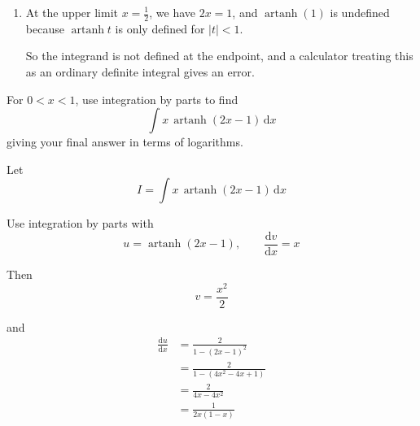 \documentclass[leqno]{article}
\begin{document}
\begin{enumerate}[
  label=\textbf{\arabic*.},
  leftmargin=*,
  topsep=0pt,
  partopsep=0pt,
  parsep=0pt
]
\begin{djsSolution}
\begin{enumerate}[label=\textbf{(\alph*)}]
So
\begin{align*}
I&=\frac13\times\frac12\ln 5+\frac14\ln\left(\frac59\right)\\
&=\frac16\ln 5+\frac14(\ln 5-\ln 9)\\
&=\frac16\ln 5+\frac14\ln 5-\frac12\ln 3\\
&=\frac{5}{12}\ln 5-\frac12\ln 3
\end{align*}

This can also be written as
\begin{align*}
I&=\frac1{12}\bigl(5\ln 5-6\ln 3\bigr)\\
&=\frac1{12}\ln\left(\frac{5^5}{3^6}\right)\\
&=\frac1{12}\ln\left(\frac{3125}{729}\right)
\end{align*}

Therefore
\[
\int_0^{1/3}\operatorname{artanh}(2x)\,\mathrm{d}x
=\frac{5}{12}\ln 5-\frac12\ln 3
=\frac1{12}\ln\left(\frac{3125}{729}\right)
\]

  \item At the upper limit \(x=\frac12\), we have \(2x=1\), and \(\operatorname{artanh}(1)\) is undefined because \(\operatorname{artanh}t\) is only defined for \(|t|<1\).

So the integrand is not defined at the endpoint, and a calculator treating this as an ordinary definite integral gives an error.
\end{enumerate}
\end{djsSolution}


\newpage

\questionitem

For $0<x<1$, use integration by parts to find
\[
\int x\,\operatorname{artanh}(2x-1)\,\mathrm{d}x
\]
giving your final answer in terms of logarithms. 

\vspace*{10pt}

\begin{djsSolution}
Let
\[
I=\int x\,\operatorname{artanh}(2x-1)\,\mathrm{d}x
\]

Use integration by parts with
\[
u=\operatorname{artanh}(2x-1), \qquad \frac{\mathrm{d}v}{\mathrm{d}x}=x
\]

Then
\[
v=\frac{x^2}{2}
\]

and
\begin{align*}
\frac{\mathrm{d}u}{\mathrm{d}x}
&=\frac{2}{1-(2x-1)^2} \\
&=\frac{2}{1-(4x^2-4x+1)} \\
&=\frac{2}{4x-4x^2} \\
&=\frac{1}{2x(1-x)}
\end{align*}


\end{djsSolution}
\end{enumerate}
\end{document}
